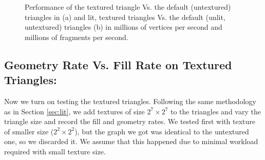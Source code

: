 \begin{figure}[!tbh]
 \centering  
  \caption{Performance of the textured triangle Vs. the default (untextured) triangles in \protect{\wes} (a) and lit, textured triangles Vs. the default (unlit, untextured) triangles (b) in millions of vertices per second and millions of fragments per second.}
   \label{fig:fill_geo2}
\end{figure} 

\subsection{Geometry Rate Vs. Fill Rate on Textured Triangles:}\label{sec:tx}
Now we turn on testing the textured triangles. Following the same methodology as in Section \ref{sec:lit}, we add textures of size $2^{7}\times2^{7}$ to the triangles and vary the triangle size and record the fill and geometry rates. We tested first with texture of smaller size ($2^{2}\times2^{2}$), but the graph we got was identical to the untextured one, so we discarded it. We assume that this happened due to minimal workload required with small texture size. 

